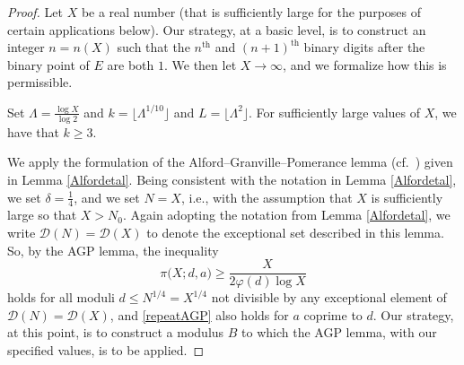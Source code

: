 \documentclass[12pt]{article}
\begin{document}
\begin{proof}
 Let $X$ be a real number (that is sufficiently large for the purposes of certain applications below). 
 Our strategy, at a basic level, is to construct
 an integer $n = n(X)$ such that 
 the $n^{\text{th}}$ and $(n+1)^{\text{th}}$ binary digits after the binary point of $E$ are both $1$. 
 We then let $X \to \infty$, and we formalize how this is permissible. 

 Set $\Lambda = \frac{\log X}{\log 2}$ and $k = \lfloor \Lambda^{1/10} \rfloor$ and $L = \lfloor \Lambda^{2} \rfloor$.
 For sufficiently large values of $X$, we have that $k \geq 3$. 

 We apply the formulation of the Alford--Granville--Pomerance lemma \cite{AlfordGranvillePomerance1994} (cf.\ \cite{Vandehey2013}) 
 given in Lemma \ref{Alfordetal}. Being consistent with the notation in Lemma \ref{Alfordetal}, we set $\delta = \frac{1}{4}$, and we set 
 $N = X$, i.e., with the assumption that $X$ is sufficiently large so that $X > N_0$. Again adopting the notation from 
 Lemma \ref{Alfordetal}, we write $\mathcal{D}(N) = \mathcal{D}(X)$
 to denote the exceptional set described in this lemma. So, by the AGP lemma, the inequality 
\begin{equation}\label{repeatAGP}
 \pi\big( X; d, a \big) \geq \frac{X}{2 \varphi(d) \log X} 
\end{equation}
 holds for all moduli $d \leq N^{1/4} = X^{1/4}$ not divisible by any exceptional element of $\mathcal{D}(N) = \mathcal{D}(X)$, 
 and \eqref{repeatAGP} also holds for $a$ coprime to $d$. 
 Our strategy, at this point, is to construct a modulus $B$ to which the 
 AGP lemma, with our specified values, is to be applied. 


\end{proof}
\end{document}
